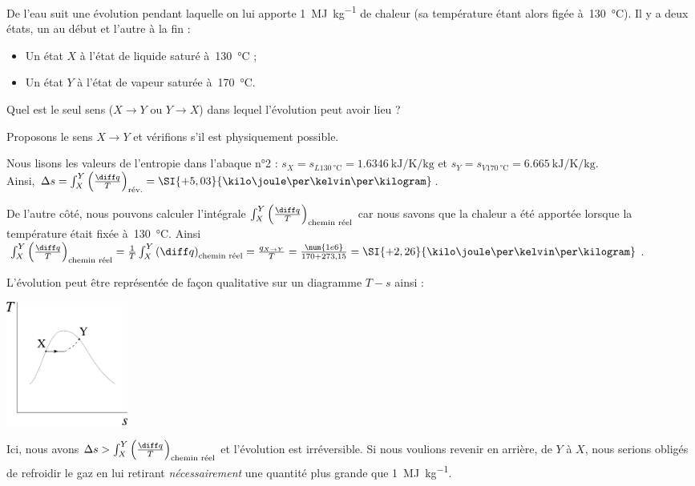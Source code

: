 		\begin{anexample}
			De l’eau suit une évolution pendant laquelle on lui apporte \SI{1}{\mega\joule\per\kilogram} de chaleur (sa température étant alors figée à~\SI{130}{\degreeCelsius}). Il y a deux états, un au début et l’autre à la fin :
				\begin{itemize}
					\item Un état $X$ à l’état de liquide saturé à~\SI{130}{\degreeCelsius} ;
					\item Un état $Y$ à l’état de vapeur saturée à~\SI{170}{\degreeCelsius}.
				\end{itemize}
			Quel est le seul sens ($X \to Y$ ou $Y \to X$) dans lequel l’évolution peut avoir lieu ?
						
				\begin{answer}
					Proposons le sens $X \to Y$ et vérifions s’il est physiquement possible.
					
					Nous lisons les valeurs de l’entropie dans l’abaque n°2 : $s_X = s_{L \SI{130}{\degreeCelsius}} = \SI{1,6346}{\kilo\joule\per\kelvin\per\kilogram}$ et $s_Y = s_{V \SI{170}{\degreeCelsius}} = \SI{6,665}{\kilo\joule\per\kelvin\per\kilogram}$. \\
					Ainsi, $\Delta s = \int_X^Y \left(\frac{\diff q}{T}\right)_\text{rév.} = \SI{+5,03}{\kilo\joule\per\kelvin\per\kilogram}$.
					
					De l’autre côté, nous pouvons calculer l’intégrale $\int_X^Y \left(\frac{\diff q}{T}\right)_\text{chemin réel}$ car nous savons que la chaleur a été apportée lorsque la température était fixée à~\SI{130}{\degreeCelsius}. Ainsi $\int_X^Y \left(\frac{\diff q}{T}\right)_\text{chemin réel} = \frac{1}{T} \int_X^Y \left(\diff q\right)_\text{chemin réel} = \frac{q_{X\to Y}}{T} = \frac{\num{1e6}}{170+273,15} = \SI{+2,26}{\kilo\joule\per\kelvin\per\kilogram}$.
					
					L’évolution peut être représentée de façon qualitative sur un diagramme $T-s$ ainsi :
						\begin{center}\includegraphics[width=4cm]{images/exe_ts_8.png}\end{center}
					
					Ici, nous avons $\Delta s > \int_X^Y \left(\frac{\diff q}{T}\right)_\text{chemin réel}$ et l’évolution est irréversible. Si nous voulions revenir en arrière, de $Y$ à $X$, nous serions obligés de refroidir le gaz en lui retirant \emph{nécessairement} une quantité plus grande que \SI{1}{\mega\joule\per\kilogram}.
				
				\end{answer}
		\end{anexample}

